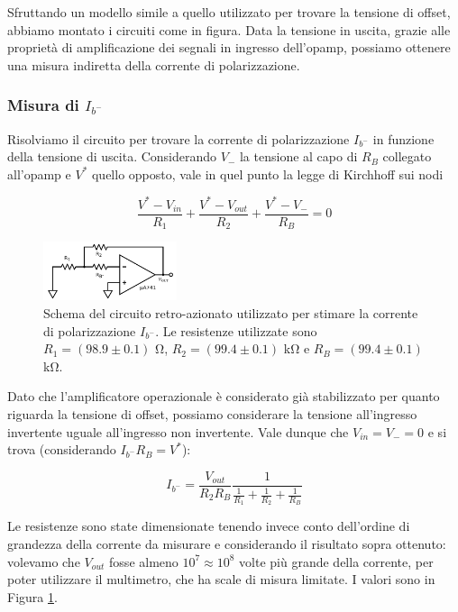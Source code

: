 Sfruttando un modello simile a quello utilizzato per trovare la tensione di offset, abbiamo montato i circuiti come in figura. Data la tensione in uscita, grazie alle proprietà di amplificazione dei segnali in ingresso dell'opamp, possiamo ottenere una misura indiretta della corrente di polarizzazione.

\subsubsection*{Misura di $I_{b^-}$}

Risolviamo il circuito per trovare la corrente di polarizzazione $I_{b^-}$ in funzione della tensione di uscita. Considerando $V_{-}$ la tensione al capo di $R_B$ collegato all'opamp e $V^*$ quello opposto, vale in quel punto la legge di Kirchhoff sui nodi

$$\frac{V^* - V_{in}}{R_1} + \frac{V^*-V_{out}}{R_2} + \frac{V^*-V_{-}}{R_B}=0$$

\begin{figure}
  \begin{center}
    \includegraphics[width=0.35\textwidth]{../E02/latex/inv_current.pdf}
  \end{center}
  \caption{Schema del circuito retro-azionato utilizzato per stimare la corrente di polarizzazione $I_{b^-}$. Le resistenze utilizzate sono $R_1=(98.9\pm0.1)$ \si{\ohm}, $R_2=(99.4\pm0.1)$ \si{\kilo\ohm} e $R_B=(99.4\pm0.1)$ \si{\kilo\ohm}.}
  \label{circuito:rel2_correnti_retroazione_inv}
\end{figure}

Dato che l'amplificatore operazionale è considerato già stabilizzato per quanto riguarda la tensione di offset, possiamo considerare la tensione all'ingresso invertente uguale all'ingresso non invertente. Vale dunque che $V_{in}=V_{-}=0$ e si trova (considerando $I_{b^-} R_B = V^*$):

$$I_{b^-}=\frac{V_{out}}{R_2 R_B}\frac{1}{\frac{1}{R_1}+\frac{1}{R_2}+\frac{1}{R_B}}$$

Le resistenze sono state dimensionate tenendo invece conto dell'ordine di grandezza della corrente da misurare e considerando il risultato sopra ottenuto: volevamo che $V_{out}$ fosse almeno $10^7\approx10^8$ volte più grande della corrente, per poter utilizzare il multimetro, che ha scale di misura limitate. I valori sono in Figura \ref{circuito:rel2_correnti_retroazione_inv}.

